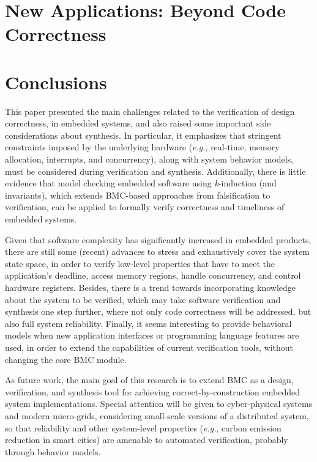 \documentclass{acm_sen_article}
\begin{document}
{{\section{New Applications: Beyond Code Correctness}
\label{Newapp}


\section{Conclusions}
\label{conclusions}

This paper presented the main challenges related to the verification of design correctness, in embedded systems, and also raised some important side considerations about synthesis. In particular, it emphasizes that stringent constraints imposed by the underlying hardware ({\it e.g.}, real-time, memory allocation, interrupts, and concurrency), along with system behavior models, must be considered during verification and synthesis. Additionally, there is little evidence that model checking embedded software using \textit{k}-induction (and invariants), which
extends BMC-based approaches from falsification to verification, can be applied to formally verify correctness and timeliness of embedded systems. 

Given that software complexity has significantly increased in embedded products, there are still some (recent) advances to stress and exhaustively cover the system state space, in order to verify low-level properties that have to meet the application's deadline, access memory regions, handle concurrency, and control hardware registers. Besides, there is a trend towards incorporating knowledge about the system to be verified, which may take software verification and synthesis one step further, where not only code correctness will be addressed, but also full system reliability. Finally, it seems interesting to provide behavioral models when new application interfaces or programming language features are used, in order to extend the capabilities of current verification tools, without changing the core BMC module.

As future work, the main goal of this research is to extend BMC as a design, verification, and synthesis tool for achieving correct-by-construction embedded system implementations. Special attention will be given to cyber-physical systems and modern micro-grids, considering small-scale versions of a distributed system, so that reliability and other system-level properties ({\it e.g.}, carbon emission reduction in smart cities) are amenable to automated verification, probably through behavior models.



}}
\end{document}
